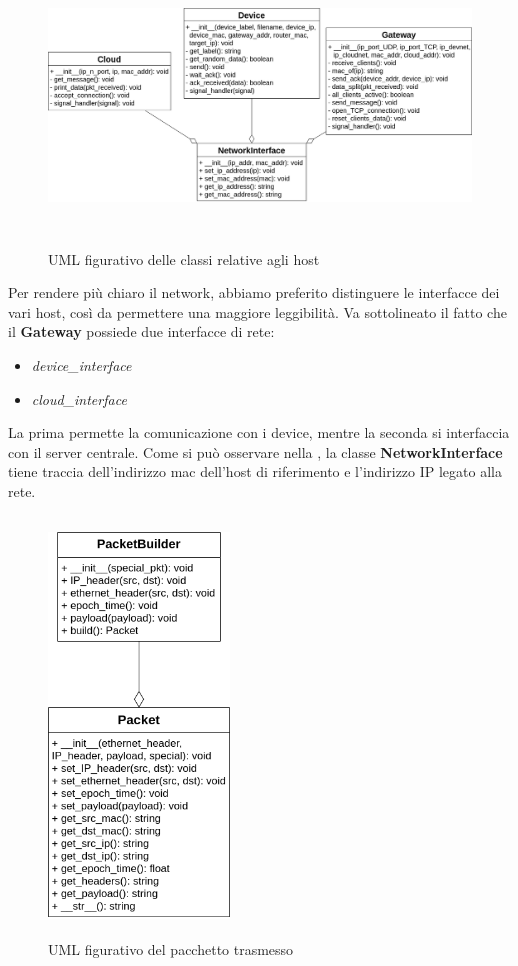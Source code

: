 \documentclass[a4paper,12pt]{report}
\begin{document}
\begin{figure}[H]
\centering{}
\includegraphics[width=\textwidth,height=20em]{img/UML_Hosts_Classes.png}
\caption{UML figurativo delle classi relative agli host}
\label{img:uml_hosts_classes}
\end{figure}
Per rendere più chiaro il network, abbiamo preferito distinguere le interfacce dei vari host, così da permettere una maggiore leggibilità.
Va sottolineato il fatto che il \textbf{Gateway} possiede due interfacce di rete:
\begin{itemize}
    \item \emph{device\_interface}
    \item \emph{cloud\_interface}
\end{itemize}
La prima permette la comunicazione con i device, mentre la seconda si interfaccia con il server centrale.
Come si può osservare nella , la classe \textbf{NetworkInterface} tiene traccia dell'indirizzo mac dell'host di riferimento e l'indirizzo IP legato alla rete.
\begin{figure}[H]
\centering{}
\includegraphics[width=13em,height=30em]{img/UML_Packet_PacketBuilder.png}
\caption{UML figurativo del pacchetto trasmesso}
\label{img:uml_packet_packetbuilder}
\end{figure}
\end{document}
